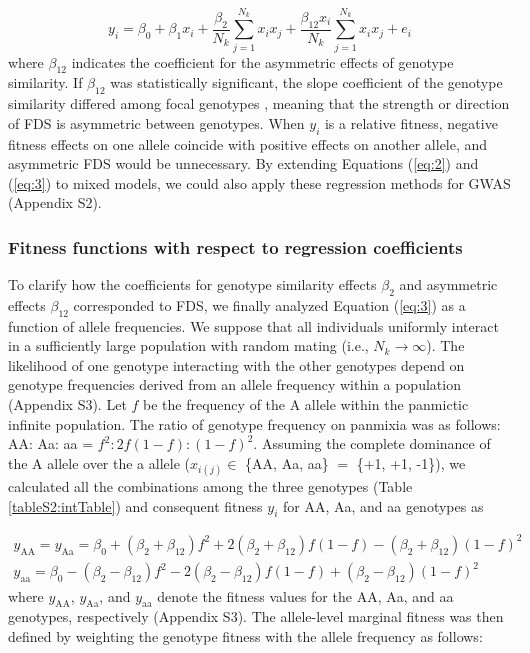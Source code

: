 \documentclass[12pt,]{article}
\begin{document}
\begin{equation}
y_i = \beta_0 + \beta_1x_i + \frac{\beta_2}{N_k}\sum^{N_{k}}_{j=1}{x_ix_j} + \frac{\beta_{12}x_i}{N_k}\sum^{N_{k}}_{j=1}{x_ix_j} + e_i \label{eq:3}
\end{equation}
\noindent
where $\beta_{12}$ indicates the coefficient for the asymmetric effects of genotype similarity. If $\beta_{12}$ was statistically significant, the slope coefficient of the genotype similarity differed among focal genotypes \citep{sato2019neighbor}, meaning that the strength or direction of FDS is asymmetric between genotypes. When $y_i$ is a relative fitness, negative fitness effects on one allele coincide with positive effects on another allele, and asymmetric FDS would be unnecessary. By extending Equations (\ref{eq:2}) and (\ref{eq:3}) to mixed models, we could also apply these regression methods for GWAS (Appendix S2).


\subsubsection{Fitness functions with respect to regression coefficients}
To clarify how the coefficients for genotype similarity effects $\beta_2$ and asymmetric effects $\beta_{12}$ corresponded to FDS, we finally analyzed Equation (\ref{eq:3}) as a function of allele frequencies. We suppose that all individuals uniformly interact in a sufficiently large population with random mating (i.e., $N_k \to \infty$). The likelihood of one genotype interacting with the other genotypes depend on genotype frequencies derived from an allele frequency within a population (Appendix S3). Let $f$ be the frequency of the A allele within the panmictic infinite population. The ratio of genotype frequency on panmixia was as follows: AA: Aa: aa = $f^2:2f(1-f):(1-f)^2$. Assuming the complete dominance of the A allele over the a allele ($x_{i(j)} \in$ \{AA, Aa, aa\} $=$ \{+1, +1, -1\}), we calculated all the combinations among the three genotypes (Table \ref{tableS2:intTable}) and consequent fitness $y_i$ for AA, Aa, and aa genotypes as

\begin{subequations}
\begin{align}
y_\mathrm{AA} = y_\mathrm{Aa} = \beta_0 + (\beta_2 + \beta_{12})f^2 + 2(\beta_2 + \beta_{12}) f(1-f) - (\beta_2 + \beta_{12})(1-f)^2 \label{eq:4a} \\
y_\mathrm{aa} = \beta_0 - (\beta_2 - \beta_{12}) f^2 - 2(\beta_2 - \beta_{12})f(1-f) + (\beta_2 - \beta_{12})(1-f)^2 \label{eq:4b}
\end{align}
\end{subequations}
\noindent
where $y_\mathrm{AA}$, $y_\mathrm{Aa}$, and $y_\mathrm{aa}$ denote the fitness values for the AA, Aa, and aa genotypes, respectively (Appendix S3). The allele-level marginal fitness was then defined by weighting the genotype fitness with the allele frequency as follows:
\end{document}
